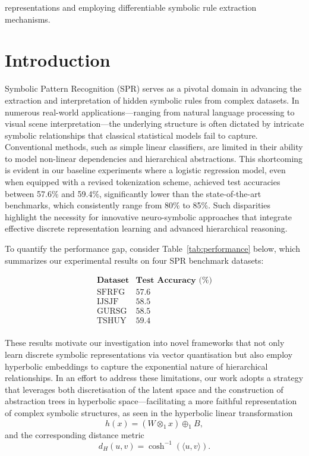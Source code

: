 \documentclass{article}
\begin{document}
representations and employing differentiable symbolic rule extraction mechanisms.

\section{Introduction}
\noindent Symbolic Pattern Recognition (SPR) serves as a pivotal domain in advancing the extraction and interpretation of hidden symbolic rules from complex datasets. In numerous real-world applications—ranging from natural language processing to visual scene interpretation—the underlying structure is often dictated by intricate symbolic relationships that classical statistical models fail to capture. Conventional methods, such as simple linear classifiers, are limited in their ability to model non-linear dependencies and hierarchical abstractions. This shortcoming is evident in our baseline experiments where a logistic regression model, even when equipped with a revised tokenization scheme, achieved test accuracies between 57.6\% and 59.4\%, significantly lower than the state-of-the-art benchmarks, which consistently range from 80\% to 85\%. Such disparities highlight the necessity for innovative neuro-symbolic approaches that integrate effective discrete representation learning and advanced hierarchical reasoning.

\medskip

\noindent To quantify the performance gap, consider Table~\ref{tab:performance} below, which summarizes our experimental results on four SPR benchmark datasets:

\[
\begin{array}{l|c}
\textbf{Dataset} & \textbf{Test Accuracy (\%)} \\ \hline
\text{SFRFG} & 57.6 \\
\text{IJSJF} & 58.5 \\
\text{GURSG} & 58.5 \\
\text{TSHUY} & 59.4 \\
\end{array}
\]

These results motivate our investigation into novel frameworks that not only learn discrete symbolic representations via vector quantisation but also employ hyperbolic embeddings to capture the exponential nature of hierarchical relationships. In an effort to address these limitations, our work adopts a strategy that leverages both discretisation of the latent space and the construction of abstraction trees in hyperbolic space—facilitating a more faithful representation of complex symbolic structures, as seen in the hyperbolic linear transformation 
\[
h(x)=(W \otimes_1 x) \oplus_1 B,
\]
and the corresponding distance metric 
\[
d_{H}(u,v)=\cosh^{-1}(\langle u,v \rangle).
\]
\end{document}
